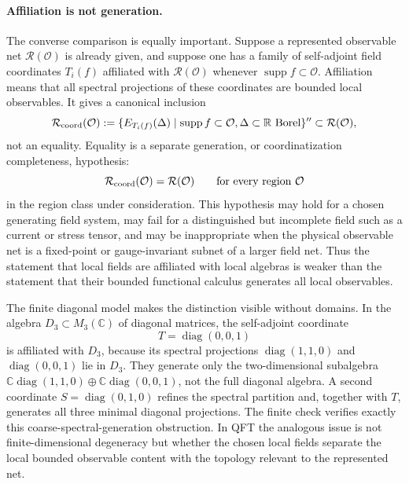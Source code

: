 \paragraph{Affiliation is not generation.}
The converse comparison is equally important.  Suppose a represented
observable net \(\mathcal R(\mathcal O)\) is already given, and suppose one
has a family of self-adjoint field coordinates \(T_i(f)\) affiliated with
\(\mathcal R(\mathcal O)\) whenever \(\operatorname{supp}f\subset\mathcal O\).
Affiliation means that all spectral projections of these coordinates are
bounded local observables.  It gives a canonical inclusion
\begin{equation}
  \mathcal R_{\rm coord}(\mathcal O)
  :=
  \{E_{T_i(f)}(\Delta)\mid
    \operatorname{supp}f\subset\mathcal O,
    \Delta\subset\mathbb R\text{ Borel}\}''
  \subset
  \mathcal R(\mathcal O),
  \label{eq:affiliated-coordinate-generated-subnet}
\end{equation}
not an equality.  Equality is a separate generation, or coordinatization
completeness, hypothesis:
\[
  \mathcal R_{\rm coord}(\mathcal O)=\mathcal R(\mathcal O)
  \qquad\text{for every region }\mathcal O
\]
in the region class under consideration.  This hypothesis may hold for a
chosen generating field system, may fail for a distinguished but incomplete
field such as a current or stress tensor, and may be inappropriate when the
physical observable net is a fixed-point or gauge-invariant subnet of a
larger field net.  Thus the statement that local fields are affiliated with
local algebras is weaker than the statement that their bounded functional
calculus generates all local observables.

The finite diagonal model makes the distinction visible without domains.  In
the algebra \(D_3\subset M_3(\mathbb C)\) of diagonal matrices, the
self-adjoint coordinate
\[
  T=\operatorname{diag}(0,0,1)
\]
is affiliated with \(D_3\), because its spectral projections
\(\operatorname{diag}(1,1,0)\) and \(\operatorname{diag}(0,0,1)\) lie in
\(D_3\).  They generate only the two-dimensional subalgebra
\(\mathbb C\operatorname{diag}(1,1,0)\oplus
\mathbb C\operatorname{diag}(0,0,1)\), not the full diagonal algebra.  A
second coordinate \(S=\operatorname{diag}(0,1,0)\) refines the spectral
partition and, together with \(T\), generates all three minimal diagonal
projections.  The finite check
 verifies exactly this
coarse-spectral-generation obstruction.  In QFT the analogous issue is not
finite-dimensional degeneracy but whether the chosen local fields separate
the local bounded observable content with the topology relevant to the
represented net.


